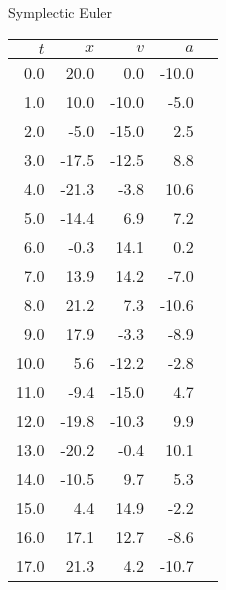 \documentclass{beamer}
\begin{document}
\begin{minipage}{0.45\textwidth}
{\scriptsize
Symplectic Euler\\
\begin{tabular}{r|rrrr}
$t$ & $x$ & $v$ & $a$ \\\hline
0.0  &  20.0  &  0.0  &  -10.0  &  \\
1.0  &  10.0  &  -10.0  &  -5.0  &  \\
2.0  &  -5.0  &  -15.0  &  2.5  &  \\
3.0  &  -17.5  &  -12.5  &  8.8  &  \\
4.0  &  -21.3  &  -3.8  &  10.6  &  \\
5.0  &  -14.4  &  6.9  &  7.2  &  \\
6.0  &  -0.3  &  14.1  &  0.2  &  \\
7.0  &  13.9  &  14.2  &  -7.0  &  \\
8.0  &  21.2  &  7.3  &  -10.6  &  \\
9.0  &  17.9  &  -3.3  &  -8.9  &  \\
10.0  &  5.6  &  -12.2  &  -2.8  &  \\
11.0  &  -9.4  &  -15.0  &  4.7  &  \\
12.0  &  -19.8  &  -10.3  &  9.9  &  \\
13.0  &  -20.2  &  -0.4  &  10.1  &  \\
14.0  &  -10.5  &  9.7  &  5.3  &  \\
15.0  &  4.4  &  14.9  &  -2.2  &  \\
16.0  &  17.1  &  12.7  &  -8.6  &  \\
17.0  &  21.3  &  4.2  &  -10.7  &  \\
\end{tabular}
}
\end{minipage}\hfill
\end{document}
